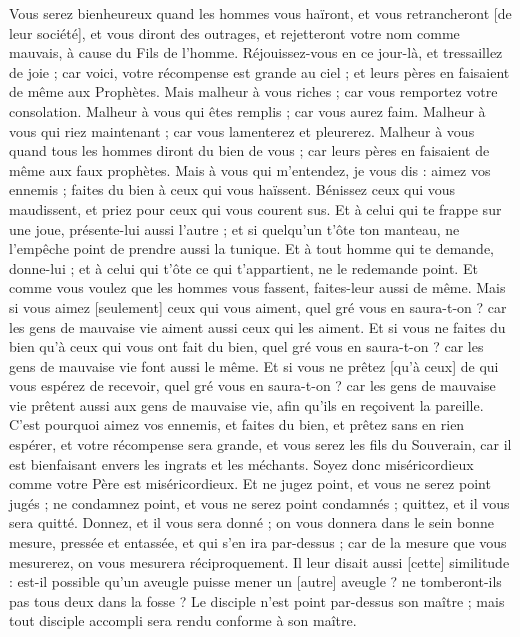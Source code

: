 \begin{multicols}{2}
Vous serez bienheureux quand les hommes vous haïront, et vous retrancheront [de leur société], et vous diront des outrages, et rejetteront votre nom comme mauvais, à cause du Fils de l'homme.
Réjouissez-vous en ce jour-là, et tressaillez de joie ; car voici, votre récompense est grande au ciel ; et leurs pères en faisaient de même aux Prophètes.
Mais malheur à vous riches ; car vous remportez votre consolation.
Malheur à vous qui êtes remplis ; car vous aurez faim. Malheur à vous qui riez maintenant ; car vous lamenterez et pleurerez.
Malheur à vous quand tous les hommes diront du bien de vous ; car leurs pères en faisaient de même aux faux prophètes.
Mais à vous qui m'entendez, je vous dis : aimez vos ennemis ; faites du bien à ceux qui vous haïssent.
Bénissez ceux qui vous maudissent, et priez pour ceux qui vous courent sus.
Et à celui qui te frappe sur une joue, présente-lui aussi l'autre ; et si quelqu'un t'ôte ton manteau, ne l'empêche point de prendre aussi la tunique.
Et à tout homme qui te demande, donne-lui ; et à celui qui t'ôte ce qui t'appartient, ne le redemande point.
Et comme vous voulez que les hommes vous fassent, faites-leur aussi de même.
Mais si vous aimez [seulement] ceux qui vous aiment, quel gré vous en saura-t-on ? car les gens de mauvaise vie aiment aussi ceux qui les aiment.
Et si vous ne faites du bien qu'à ceux qui vous ont fait du bien, quel gré vous en saura-t-on ? car les gens de mauvaise vie font aussi le même.
Et si vous ne prêtez [qu'à ceux] de qui vous espérez de recevoir, quel gré vous en saura-t-on ? car les gens de mauvaise vie prêtent aussi aux gens de mauvaise vie, afin qu'ils en reçoivent la pareille.
C'est pourquoi aimez vos ennemis, et faites du bien, et prêtez sans en rien espérer, et votre récompense sera grande, et vous serez les fils du Souverain, car il est bienfaisant envers les ingrats et les méchants.
Soyez donc miséricordieux comme votre Père est miséricordieux.
Et ne jugez point, et vous ne serez point jugés ; ne condamnez point, et vous ne serez point condamnés ; quittez, et il vous sera quitté.
Donnez, et il vous sera donné ; on vous donnera dans le sein bonne mesure, pressée et entassée, et qui s'en ira par-dessus ; car de la mesure que vous mesurerez, on vous mesurera réciproquement.
Il leur disait aussi [cette] similitude : est-il possible qu'un aveugle puisse mener un [autre] aveugle ? ne tomberont-ils pas tous deux dans la fosse ?
Le disciple n'est point par-dessus son maître ; mais tout disciple accompli sera rendu conforme à son maître.

\end{multicols}

